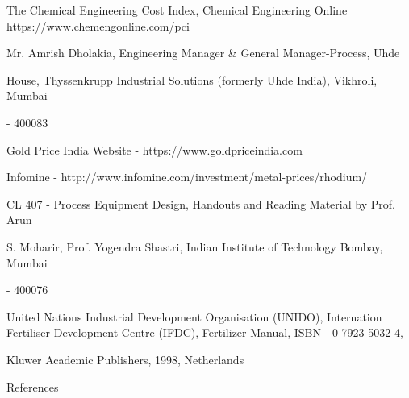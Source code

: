 \documentclass[a4paper,portrait,12pt]{article}
\begin{document}
\begin{flushleft}
[12] The Chemical Engineering Cost Index, Chemical Engineering Online https://www.chemengonline.com/pci
\end{flushleft}


\begin{flushleft}
[13] Mr. Amrish Dholakia, Engineering Manager \& General Manager-Process, Uhde
\end{flushleft}


\begin{flushleft}
House, Thyssenkrupp Industrial Solutions (formerly Uhde India), Vikhroli, Mumbai
\end{flushleft}


- 400083


\begin{flushleft}
[14] Gold Price India Website - https://www.goldpriceindia.com
\end{flushleft}


\begin{flushleft}
[15] Infomine - http://www.infomine.com/investment/metal-prices/rhodium/
\end{flushleft}


\begin{flushleft}
[16] CL 407 - Process Equipment Design, Handouts and Reading Material by Prof. Arun
\end{flushleft}


\begin{flushleft}
S. Moharir, Prof. Yogendra Shastri, Indian Institute of Technology Bombay, Mumbai
\end{flushleft}


- 400076


\begin{flushleft}
[17] United Nations Industrial Development Organisation (UNIDO), Internation Fertiliser Development Centre (IFDC), Fertilizer Manual, ISBN - 0-7923-5032-4,
\end{flushleft}


\begin{flushleft}
Kluwer Academic Publishers, 1998, Netherlands
\end{flushleft}





\begin{flushleft}
\newpage
References
\end{flushleft}
\end{document}
